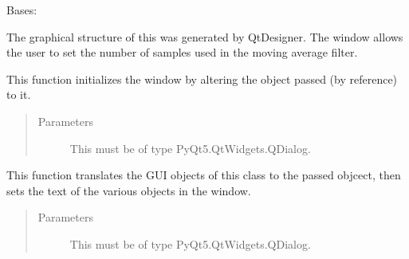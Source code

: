 \documentclass[letterpaper,10pt,english]{sphinxmanual}
\begin{document}
\begin{fulllineitems}
\label{\detokenize{windowFilterGUI:windowFilterGUI.Ui_Dialog}}
Bases: 

The graphical structure of this  was generated by QtDesigner.
The window allows the user to set the number of samples used in the moving average filter.

\begin{fulllineitems}
\label{\detokenize{windowFilterGUI:windowFilterGUI.Ui_Dialog.setupUi}}
This function initializes the window by altering the  object passed (by reference) to it.
\begin{quote}\begin{description}
\item[{Parameters}] \leavevmode
{} \textendash{} This must be of type PyQt5.QtWidgets.QDialog.

\end{description}\end{quote}

\end{fulllineitems}


\begin{fulllineitems}
\label{\detokenize{windowFilterGUI:windowFilterGUI.Ui_Dialog.retranslateUi}}
This function translates the GUI objects of this class to the passed  objcect,
then sets the text of the various objects in the window.
\begin{quote}\begin{description}
\item[{Parameters}] \leavevmode
{} \textendash{} This must be of type PyQt5.QtWidgets.QDialog.

\end{description}\end{quote}


\end{fulllineitems}
\end{fulllineitems}
\end{document}
